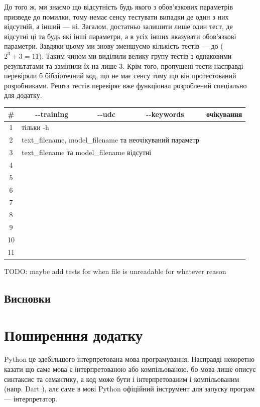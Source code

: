 \documentclass[14pt]{extarticle}
\let\oldsection\section
\renewcommand{\section}{\clearpage\oldsection}
\begin{document}
  До того ж, ми знаємо що відсутність будь
  якого з обов'язкових параметрів призведе до помилки,
  тому немає сенсу тестувати випадки де один з них відсутній,
  а інший --- ні.
  Загалом, достатньо залишити лише один тест, де
  відсутні ці та будь які інші параметри,
  а в усіх інших вказувати обов'язкові параметри.
  Завдяки цьому ми знову зменшуємо кількість тестів --- до ($2^3+3=11$).
  Таким чином ми виділили велику групу тестів з однаковими результатами
  та замінили їх на лише 3. Крім того, пропущені тести насправді перевіряли
  б бібліотечний код, що не має сенсу тому що він протестований розробниками.
  Решта тестів перевіряє вже функціонал розроблений спеціально для додатку.

  \vspace{\baselineskip}
  \noindent
  \begin{tabular}{|c|c|c|c|c|}
    \hline
    \# & -{}-training & -{}-udc & -{}-keywords & очікування \\
    \hline
    1  & \multicolumn{3}{l|}{тільки -h} & \\
    2  & \multicolumn{3}{l|}{text\_filename, model\_filename та неочікуваний параметр} & \\
    3  & \multicolumn{3}{l|}{text\_filename та model\_filename відсутні} & \\
    \hline
    4  & & & & \\
    5  & & & & \\
    6  & & & & \\
    7  & & & & \\
    8  & & & & \\
    9  & & & & \\
    10 & & & & \\
    11 & & & & \\
    \hline
  \end{tabular}

  \vspace{\baselineskip}
  TODO: maybe add tests for when file is unreadable for whatever reason


  \subsection{Висновки}

  \section{Поширенння додатку}
  Python це здебільшого інтерпретована мова програмування.
  Насправді некоретно казати що саме мова є інтерпретованою або компільованою,
  бо мова лише описує синтаксис та семантику,
  а код може бути і інтерпретованим і компільованим (напр. Dart \cite{dart_lang}),
  алє саме в мові Python офіційний інструмент для запуску програм ---
  інтерпретатор.
  
\end{document}
